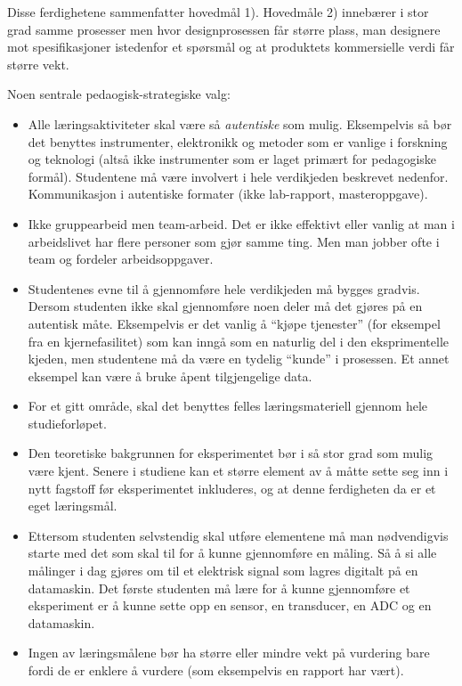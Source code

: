Disse ferdighetene sammenfatter hovedmål 1). Hovedmåle 2) innebærer i stor grad samme prosesser men hvor designprosessen får større plass, man  designere mot spesifikasjoner istedenfor et spørsmål og at produktets kommersielle verdi får større vekt.

Noen sentrale pedaogisk-strategiske valg:

\begin{itemize}
	\item Alle læringsaktiviteter skal være så \emph{autentiske} som mulig. Eksempelvis så bør det benyttes instrumenter, elektronikk og metoder som er vanlige i forskning og teknologi (altså ikke instrumenter som er laget primært for pedagogiske formål). Studentene må være involvert i hele verdikjeden beskrevet nedenfor. Kommunikasjon i autentiske formater (ikke lab-rapport, masteroppgave).
	\item Ikke gruppearbeid men team-arbeid. Det er ikke effektivt eller vanlig at man i arbeidslivet har flere personer som gjør samme ting. Men man jobber ofte i team og fordeler arbeidsoppgaver.
	\item Studentenes evne til å gjennomføre hele verdikjeden må bygges gradvis. Dersom studenten ikke skal gjennomføre noen deler må det gjøres på en autentisk måte. Eksempelvis er det vanlig å \enquote{kjøpe tjenester} (for eksempel fra en kjernefasilitet) som kan inngå som en naturlig del i den eksprimentelle kjeden, men studentene må da være en tydelig \enquote{kunde} i prosessen. Et annet eksempel kan være å bruke åpent tilgjengelige data.
	\item For et gitt område, skal det benyttes felles læringsmateriell gjennom hele studieforløpet.
	\item Den teoretiske bakgrunnen for eksperimentet bør i så stor grad som mulig være kjent. Senere i studiene kan et større element av å måtte sette seg inn i nytt fagstoff før eksperimentet inkluderes, og at denne ferdigheten da er et eget læringsmål.
	\item Ettersom studenten selvstendig skal utføre elementene må man nødvendigvis starte med det som skal til for å kunne gjennomføre en måling. Så å si alle målinger i dag gjøres om til et elektrisk signal som lagres digitalt på en datamaskin. Det første studenten må lære for å kunne gjennomføre et eksperiment er å kunne sette opp en sensor, en transducer, en ADC og en datamaskin.
	\item Ingen av læringsmålene bør ha større eller mindre vekt på vurdering bare fordi de er enklere å vurdere (som eksempelvis en rapport har vært).

\end{itemize}
